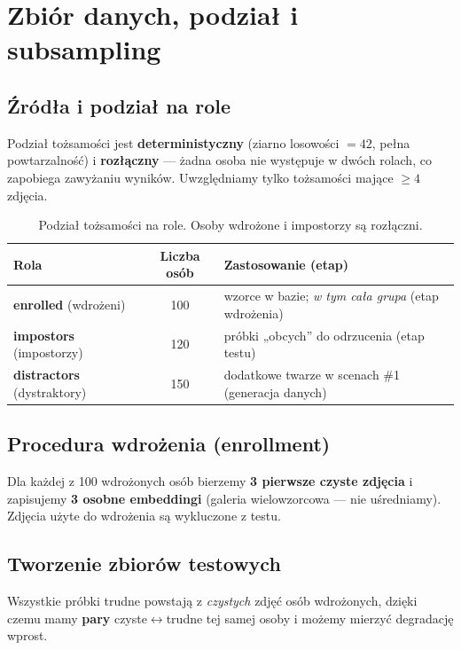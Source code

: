 \documentclass[11pt,a4paper]{article}
\begin{document}
\section{Zbiór danych, podział i subsampling}

\subsection{Źródła i podział na role}
Podział tożsamości jest \textbf{deterministyczny} (ziarno losowości $=42$, pełna
powtarzalność) i \textbf{rozłączny} --- żadna osoba nie występuje w dwóch rolach, co
zapobiega zawyżaniu wyników. Uwzględniamy tylko tożsamości mające $\ge 4$ zdjęcia.

\begin{table}[H]\centering
\begin{tabular}{lcl}
\toprule
Rola & Liczba osób & Zastosowanie (etap) \\
\midrule
\textbf{enrolled} (wdrożeni) & 100 & wzorce w bazie; \emph{w tym cała grupa} (etap wdrożenia) \\
\textbf{impostors} (impostorzy) & 120 & próbki „obcych” do odrzucenia (etap testu) \\
\textbf{distractors} (dystraktory) & 150 & dodatkowe twarze w scenach \#1 (generacja danych) \\
\bottomrule
\end{tabular}
\caption{Podział tożsamości na role. Osoby wdrożone i impostorzy są rozłączni.}
\end{table}

\subsection{Procedura wdrożenia (enrollment)}
Dla każdej z 100 wdrożonych osób bierzemy \textbf{3 pierwsze czyste zdjęcia} i zapisujemy
\textbf{3 osobne embeddingi} (galeria wielowzorcowa --- nie uśredniamy). Zdjęcia użyte do
wdrożenia są wykluczone z testu.

\subsection{Tworzenie zbiorów testowych}
Wszystkie próbki trudne powstają z \emph{czystych} zdjęć osób wdrożonych, dzięki czemu mamy
\textbf{pary} czyste$\leftrightarrow$trudne tej samej osoby i możemy mierzyć degradację wprost.
\end{document}
